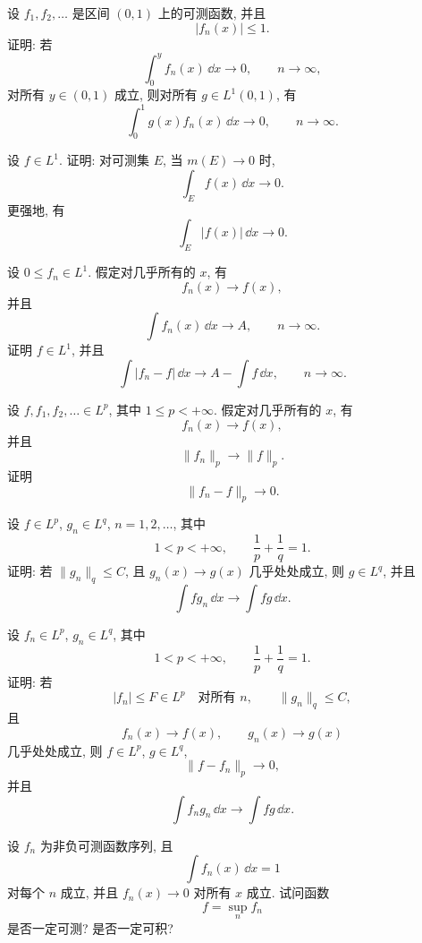 \begin{exer}
	设 \(f_1,f_2,\ldots\) 是区间 \((0,1)\) 上的可测函数, 并且
	\[
	|f_n(x)|\leq1.
	\]
	证明: 若
	\[
	\int_0^y f_n(x)\,\dd x\to0,
	\qquad n\to\infty,
	\]
	对所有 \(y\in(0,1)\) 成立, 则对所有 \(g\in L^1(0,1)\), 有
	\[
	\int_0^1 g(x)f_n(x)\,\dd x\to0,
	\qquad n\to\infty.
	\]
\end{exer}

\begin{exer}
	设 \(f\in L^1\). 证明: 对可测集 \(E\), 当 \(m(E)\to0\) 时,
	\[
	\int_E f(x)\,\dd x\to0.
	\]
	更强地, 有
	\[
	\int_E |f(x)|\,\dd x\to0.
	\]
\end{exer}

\begin{exer}
	设 \(0\leq f_n\in L^1\). 假定对几乎所有的 \(x\), 有
	\[
	f_n(x)\to f(x),
	\]
	并且
	\[
	\int f_n(x)\,\dd x\to A,
	\qquad n\to\infty.
	\]
	证明 \(f\in L^1\), 并且
	\[
	\int |f_n-f|\,\dd x\to A-\int f\,\dd x,
	\qquad n\to\infty.
	\]
\end{exer}

\begin{exer}
	设 \(f,f_1,f_2,\ldots\in L^p\), 其中 \(1\leq p<+\infty\). 假定对几乎所有的 \(x\), 有
	\[
	f_n(x)\to f(x),
	\]
	并且
	\[
	\|f_n\|_p\to \|f\|_p.
	\]
	证明
	\[
	\|f_n-f\|_p\to0.
	\]
\end{exer}

\begin{exer}
	设 \(f\in L^p\), \(g_n\in L^q\), \(n=1,2,\ldots\), 其中
	\[
	1<p<+\infty,
	\qquad
	\frac1p+\frac1q=1.
	\]
	证明: 若 \(\|g_n\|_q\leq C\), 且 \(g_n(x)\to g(x)\) 几乎处处成立, 则 \(g\in L^q\), 并且
	\[
	\int f g_n\,\dd x\to \int f g\,\dd x.
	\]
\end{exer}

\begin{exer}
	设 \(f_n\in L^p\), \(g_n\in L^q\), 其中
	\[
	1<p<+\infty,
	\qquad
	\frac1p+\frac1q=1.
	\]
	证明: 若
	\[
	|f_n|\leq F\in L^p\quad\text{对所有 }n,
	\qquad
	\|g_n\|_q\leq C,
	\]
	且
	\[
	f_n(x)\to f(x),
	\qquad
	g_n(x)\to g(x)
	\]
	几乎处处成立, 则 \(f\in L^p\), \(g\in L^q\),
	\[
	\|f-f_n\|_p\to0,
	\]
	并且
	\[
	\int f_n g_n\,\dd x\to \int f g\,\dd x.
	\]
\end{exer}

\begin{exer}
	设 \(f_n\) 为非负可测函数序列, 且
	\[
	\int f_n(x)\,\dd x=1
	\]
	对每个 \(n\) 成立, 并且 \(f_n(x)\to0\) 对所有 \(x\) 成立. 试问函数
	\[
	f=\sup_n f_n
	\]
	是否一定可测? 是否一定可积?
\end{exer}

